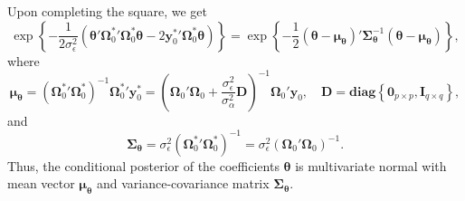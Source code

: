 \documentclass[cmfont,usenames,dvipsnames,leqno]{afit-etd}\usepackage[]{graphicx}\usepackage[]{color}
\begin{document}
Upon completing the square, we get
\begin{equation*}
  \exp\left\{-\frac{1}{2\sigma_\epsilon^2}\left(\boldsymbol{\theta}'{\boldsymbol{\Omega}_0^*}'\boldsymbol{\Omega}_0^*\boldsymbol{\theta} - 2{\boldsymbol{y}_0^*}'\boldsymbol{\Omega}_0^*\boldsymbol{\theta}\right)\right\} = \exp\left\{-\frac{1}{2}\left(\boldsymbol{\theta}-\boldsymbol{\mu}_{\boldsymbol{\theta}}\right)'\boldsymbol{\Sigma}_{\boldsymbol{\theta}}^{-1}\left(\boldsymbol{\theta}-\boldsymbol{\mu}_{\boldsymbol{\theta}}\right)\right\},
\end{equation*}
where
\begin{equation*}
  \boldsymbol{\mu}_{\boldsymbol{\theta}} = \left({\boldsymbol{\Omega}_0^*}'\boldsymbol{\Omega}_0^*\right)^{-1}{\boldsymbol{\Omega}_0^*}'\boldsymbol{y}_0^* = \left({\boldsymbol{\Omega}_0}'\boldsymbol{\Omega}_0 + \frac{\sigma_\epsilon^2}{\sigma_\alpha^2}\boldsymbol{D}\right)^{-1}{\boldsymbol{\Omega}_0}'\boldsymbol{y}_0, \quad \boldsymbol{D} = \textbf{diag}\left\{\boldsymbol{0}_{p \times p}, \boldsymbol{I}_{q \times q}\right\},
\end{equation*}
and
\begin{equation*}
  \boldsymbol{\Sigma}_{\boldsymbol{\theta}} = \sigma_\epsilon^2\left({\boldsymbol{\Omega}_0^*}'\boldsymbol{\Omega}_0^*\right)^{-1} = \sigma_\epsilon^2\left({\boldsymbol{\Omega}_0}'\boldsymbol{\Omega}_0\right)^{-1}.
\end{equation*}
Thus, the conditional posterior of the coefficients $\boldsymbol{\theta}$ is multivariate normal with mean vector $\boldsymbol{\mu}_{\boldsymbol{\theta}}$ and variance-covariance matrix $\boldsymbol{\Sigma}_{\boldsymbol{\theta}}$.
\end{document}

